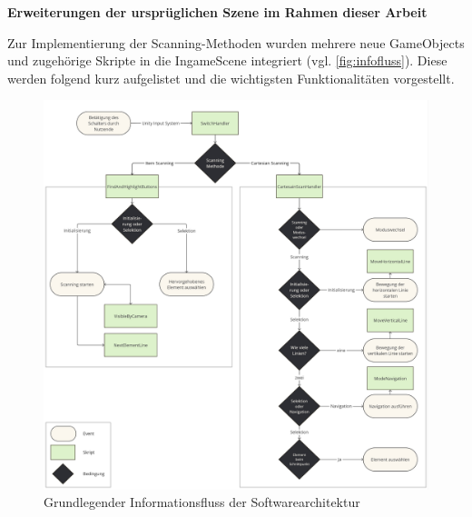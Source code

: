 {\normalfont \bfseries Erweiterungen der ursprüglichen Szene im Rahmen dieser Arbeit}

Zur Implementierung der Scanning-Methoden wurden mehrere neue GameObjects und zugehörige Skripte in die IngameScene integriert (vgl. \autoref{fig:infofluss}). Diese werden folgend kurz aufgelistet und die wichtigsten Funktionalitäten vorgestellt. 

\begin{figure}[tbhp]
    \centering
    \includegraphics[width=1\textwidth]{images/FlussdiagrammArchitektur.png}
    \caption{Grundlegender Informationsfluss der Softwarearchitektur}
    \label{fig:infofluss}
\end{figure}


